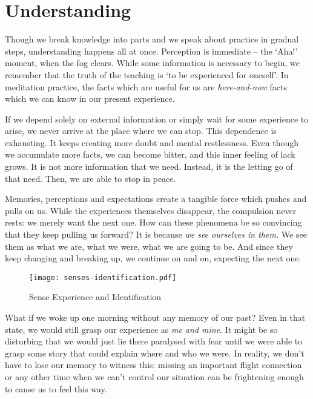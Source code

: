 \chapter{Understanding}


Though we break knowledge into parts and we speak about practice in
gradual steps, understanding happens all at once. Perception is
immediate -- the `Aha!' moment, when the fog clears. While some
information is necessary to begin, we remember that the truth of the
teaching is `to be experienced for oneself'. In meditation practice, the
facts which are useful for us are \emph{here-and-now} facts which we can
know in our present experience.

If we depend solely on external information or simply wait for some
experience to arise, we never arrive at the place where we can stop.
This dependence is exhausting. It keeps creating more doubt and mental
restlessness. Even though we accumulate more facts, we can become
bitter, and this inner feeling of lack grows. It is not more information
that we need. Instead, it is the letting go of that need. Then, we are
able to stop in peace.


Memories, perceptions and expectations create a tangible force which
pushes and pulls on us. While the experiences themselves disappear, the
compulsion never rests: we merely want the next one. How can these
phenomena be so convincing that they keep pulling us forward? It is
because \emph{we see ourselves in them.} We see them as what we are,
what we were, what we are going to be. And since they keep changing and
breaking up, we continue on and on, expecting the next one.

\clearpage
\null\vfill

\begin{figure}[h]
\caption{Sense Experience and Identification}\label{fig-senses-identification}
\bigskip
\hspace*{-10mm}%
\texttt{[image: senses-identification.pdf]}
\end{figure}

\vfill\null
\clearpage

What if we woke up one morning without any memory of our past? Even in
that state, we would still grasp our experience as \emph{me and mine}.
It might be so disturbing that we would just lie there paralysed with
fear until we were able to grasp some story that could explain where and
who we were. In reality, we don't have to lose our memory to witness
this: missing an important flight connection or any other time when we
can't control our situation can be frightening enough to cause us to
feel this way.


